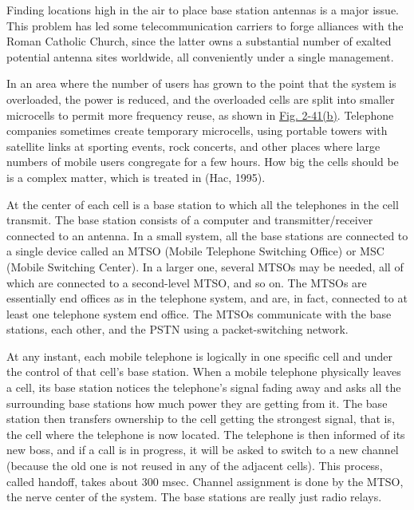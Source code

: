 
Finding locations high in the air to place base station antennas is a
major issue. This problem has led some telecommunication carriers to
forge alliances with the Roman Catholic Church, since the latter owns a
substantial number of exalted potential antenna sites worldwide, all
conveniently under a single management.

In an area where the number of users has grown to the point that the
system is overloaded, the power is reduced, and the overloaded cells are
split into smaller {microcells} to permit more frequency reuse, as shown
in
\protect\hyperlink{0130661023_ch02lev1sec6.htmlux5cux23ch02fig41}{Fig.
2-41(b)}. Telephone companies sometimes create temporary microcells,
using portable towers with satellite links at sporting events, rock
concerts, and other places where large numbers of mobile users
congregate for a few hours. How big the cells should be is a complex
matter, which is treated in (Hac, 1995).

At the center of each cell is a base station to which all the telephones
in the cell transmit. The base station consists of a computer and
transmitter/receiver connected to an antenna. In a small system, all the
base stations are connected to a single device called an {MTSO} ({Mobile
Telephone Switching Office}) or {MSC} ({Mobile Switching Center}). In a
larger one, several MTSOs may be needed, all of which are connected to a
second-level MTSO, and so on. The MTSOs are essentially end offices as
in the telephone system, and are, in fact, connected to at least one
telephone system end office. The MTSOs communicate with the base
stations, each other, and the PSTN using a packet-switching network.

At any instant, each mobile telephone is logically in one specific cell
and under the control of that cell's base station. When a mobile
telephone physically leaves a cell, its base station notices the
telephone's signal fading away and asks all the surrounding base
stations how much power they are getting from it. The base station then
transfers ownership to the cell getting the strongest signal, that is,
the cell where the telephone is now located. The telephone is then
informed of its new boss, and if a call is in progress, it will be asked
to switch to a new channel (because the old one is not reused in any of
the adjacent cells). This process, called {handoff}, takes about 300
msec. Channel assignment is done by the MTSO, the nerve center of the
system. The base stations are really just radio relays.

